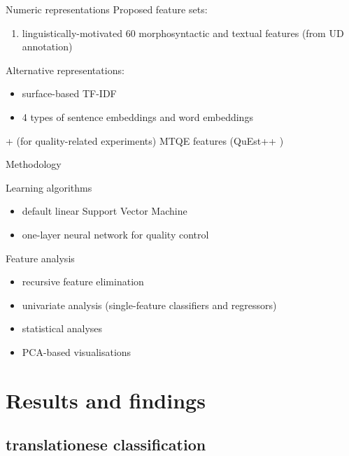 \documentclass[11pt]{beamer} %
\begin{document}
\begin{frame}{Numeric representations}
	Proposed feature sets:
\begin{enumerate}
	\item linguistically-motivated 60 morphosyntactic and textual features (from UD annotation)
\end{enumerate}
Alternative representations:
\begin{itemize}
	\item surface-based TF-IDF
	\item 4 types of sentence embeddings and word embeddings
\end{itemize}
+ (for quality-related experiments) MTQE features (QuEst++ )

\end{frame}

\begin{frame}{Methodology}

	\begin{block}{Learning algorithms}
		\begin{itemize}
			\item default linear Support Vector Machine
			\item one-layer neural network for quality control
		\end{itemize}	
	\end{block}

	\begin{block}{Feature analysis}
		\begin{itemize}
			\item recursive feature elimination %
			\item univariate analysis (single-feature classifiers and regressors)
			\item statistical analyses
			\item PCA-based visualisations
		\end{itemize}
	\end{block}

\end{frame}


\section{Results and findings}

\subsection{translationese classification}
\end{document}
